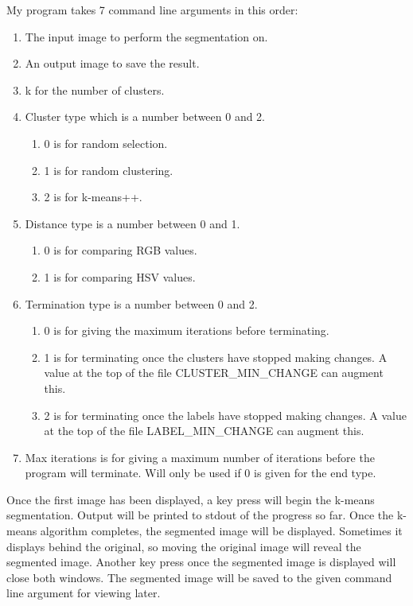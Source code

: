 \documentclass{article}
\begin{document}
My program takes 7 command line arguments in this order:
\begin{enumerate}
\item The input image to perform the segmentation on.
\item An output image to save the result.
\item k for the number of clusters.
\item Cluster type which is a number between 0 and 2.
  \begin{enumerate}
  \item 0 is for random selection.
  \item 1 is for random clustering.
  \item 2 is for k-means++.
  \end{enumerate}
\item Distance type is a number between 0 and 1.
  \begin{enumerate}
  \item 0 is for comparing RGB values.
  \item 1 is for comparing HSV values.
  \end{enumerate}
\item Termination type is a number between 0 and 2.
  \begin{enumerate}
  \item 0 is for giving the maximum iterations before terminating.
  \item 1 is for terminating once the clusters have stopped making changes. A
    value at the top of the file CLUSTER\_MIN\_CHANGE can augment this.
  \item 2 is for terminating once the labels have stopped making changes. A value
    at the top of the file LABEL\_MIN\_CHANGE can augment this.
  \end{enumerate}
\item Max iterations is for giving a maximum number of iterations before the
  program will terminate. Will only be used if 0 is given for the end type.
\end{enumerate}

Once the first image has been displayed, a key press will begin the k-means
segmentation. Output will be printed to stdout of the progress so far. Once the
k-means algorithm completes, the segmented image will be displayed. Sometimes it
displays behind the original, so moving the original image will reveal the
segmented image. Another key press once the segmented image is displayed will
close both windows. The segmented image will be saved to the given command line
argument for viewing later.
\end{document}
